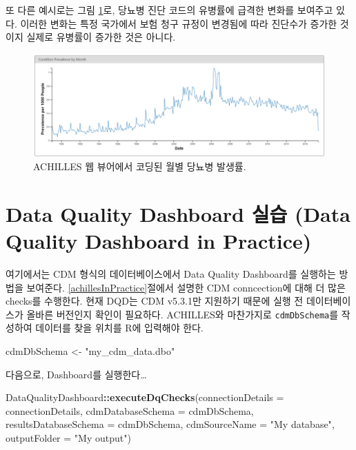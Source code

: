 \documentclass[11pt]{book}
\newenvironment{Shaded}{\begin{snugshade}}{\end{snugshade}}
\newcommand{\KeywordTok}[1]{\textcolor[rgb]{0.13,0.29,0.53}{\textbf{#1}}}
\newcommand{\DataTypeTok}[1]{\textcolor[rgb]{0.13,0.29,0.53}{#1}}
\newcommand{\StringTok}[1]{\textcolor[rgb]{0.31,0.60,0.02}{#1}}
\newcommand{\OperatorTok}[1]{\textcolor[rgb]{0.81,0.36,0.00}{\textbf{#1}}}
\newcommand{\NormalTok}[1]{#1}
\theoremstyle{definition}
\theoremstyle{definition}
\theoremstyle{definition}
\theoremstyle{remark}
\begin{document}
또 다른 예시로는 그림 \ref{fig:achillesCodeChange}로, 당뇨병 진단 코드의
유병률에 급격한 변화를 보여주고 있다. 이러한 변화는 특정 국가에서 보험
청구 규정이 변경됨에 따라 진단수가 증가한 것이지 실제로 유병률이 증가한
것은 아니다.

\begin{figure}

{\centering \includegraphics[width=1\linewidth]{images/DataQuality/achillesCodeChange} 

}

\caption{ACHILLES 웹 뷰어에서 코딩된 월별 당뇨병 발생률.}\label{fig:achillesCodeChange}
\end{figure}

\section{Data Quality Dashboard 실습 (Data Quality Dashboard in
Practice)}\label{dqdInPractice}

여기에서는 CDM 형식의 데이터베이스에서 Data Quality Dashboard를 실행하는
방법을 보여준다. \ref{achillesInPractice}절에서 설명한 CDM conncection에
대해 더 많은 checks를 수행한다. 현재 DQD는 CDM v5.3.1만 지원하기 때문에
실행 전 데이터베이스가 올바른 버전인지 확인이 필요하다. ACHILLES와
마찬가지로 \texttt{cdmDbSchema}를 작성하여 데이터를 찾을 위치를 R에
입력해야 한다.

\begin{Shaded}
\begin{Highlighting}[]
\NormalTok{cdmDbSchema <-}\StringTok{ "my_cdm_data.dbo"}
\end{Highlighting}
\end{Shaded}

다음으로, Dashboard를 실행한다\ldots{}

\begin{Shaded}
\begin{Highlighting}[]
\NormalTok{DataQualityDashboard}\OperatorTok{::}\KeywordTok{executeDqChecks}\NormalTok{(}\DataTypeTok{connectionDetails =}\NormalTok{ connectionDetails, }
                                      \DataTypeTok{cdmDatabaseSchema =}\NormalTok{ cdmDbSchema, }
                                      \DataTypeTok{resultsDatabaseSchema =}\NormalTok{ cdmDbSchema,}
                                      \DataTypeTok{cdmSourceName =} \StringTok{"My database"}\NormalTok{,}
                                      \DataTypeTok{outputFolder =} \StringTok{"My output"}\NormalTok{)}
\end{Highlighting}
\end{Shaded}
\end{document}
